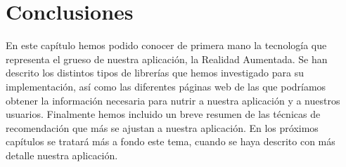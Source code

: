 \section{Conclusiones}
\label{makereference2.4}
En este capítulo hemos podido conocer de primera mano la tecnología que representa el grueso de nuestra aplicación, la Realidad Aumentada. Se han descrito 
los distintos tipos de librerías que hemos investigado para su implementación, así como las diferentes páginas web de las que podríamos obtener la información necesaria
para nutrir a nuestra aplicación y a nuestros usuarios. Finalmente hemos incluido un breve resumen de las técnicas de recomendación que más se ajustan a nuestra aplicación. En los próximos capítulos
se tratará más a fondo este tema, cuando se haya descrito con más detalle nuestra aplicación.

